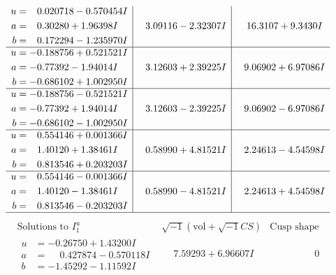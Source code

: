 \documentclass[1p]{elsarticle_modified}
\theoremstyle{definition}
\newcommand{\I}{\sqrt{-1}}
\begin{document}
$$\begin{array}{c|c|c}
\begin{aligned}
u &= \phantom{-}0.020718 - 0.570454 I \\
a &= \phantom{-}0.30280 + 1.96398 I \\
b &= \phantom{-}0.172294 - 1.235970 I\end{aligned}
 & \phantom{-}3.09116 - 2.32307 I & \phantom{-}16.3107 + 9.3430 I \\ \hline\begin{aligned}
u &= -0.188756 + 0.521521 I \\
a &= -0.77392 - 1.94014 I \\
b &= -0.686102 + 1.002950 I\end{aligned}
 & \phantom{-}3.12603 + 2.39225 I & \phantom{-}9.06902 + 6.97086 I \\ \hline\begin{aligned}
u &= -0.188756 - 0.521521 I \\
a &= -0.77392 + 1.94014 I \\
b &= -0.686102 - 1.002950 I\end{aligned}
 & \phantom{-}3.12603 - 2.39225 I & \phantom{-}9.06902 - 6.97086 I \\ \hline\begin{aligned}
u &= \phantom{-}0.554146 + 0.001366 I \\
a &= \phantom{-}1.40120 + 1.38461 I \\
b &= \phantom{-}0.813546 + 0.203203 I\end{aligned}
 & \phantom{-}0.58990 + 4.81521 I & \phantom{-}2.24613 - 4.54598 I \\ \hline\begin{aligned}
u &= \phantom{-}0.554146 - 0.001366 I \\
a &= \phantom{-}1.40120 - 1.38461 I \\
b &= \phantom{-}0.813546 - 0.203203 I\end{aligned}
 & \phantom{-}0.58990 - 4.81521 I & \phantom{-}2.24613 + 4.54598 I\\
 \hline 
 \end{array}$$\newpage$$\begin{array}{c|c|c}  
\text{Solutions to }I^u_{1}& \I (\text{vol} + \sqrt{-1}CS) & \text{Cusp shape}\\
 \hline 
\begin{aligned}
u &= -0.26750 + 1.43200 I \\
a &= \phantom{-}0.427874 - 0.570118 I \\
b &= -1.45292 - 1.11592 I\end{aligned}
 & \phantom{-}7.59293 + 6.96607 I & \phantom{-0.000000 } 0 \\ \hline\begin{aligned}

\end{aligned}
\end{array}$$
\end{document}
